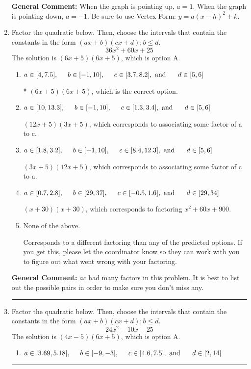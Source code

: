 \documentclass{extbook}[14pt]
\newcommand{\litem}[1]{\item #1

\rule{\textwidth}{0.4pt}}
\begin{document}
\begin{enumerate}
{\textbf{General Comment:} When the graph is pointing up, $a=1$. When the graph is pointing down, $a=-1$. Be sure to use Vertex Form: $y = a(x-h)^2+k$.
}
\litem{
Factor the quadratic below. Then, choose the intervals that contain the constants in the form $(ax+b)(cx+d); b \leq d.$
\[ 36x^{2} +60 x + 25 \]The solution is \( (6x + 5)(6x + 5) \), which is option A.\begin{enumerate}[label=\Alph*.]
\item \( a \in [4, 7.5], \hspace*{5mm} b \in [-1, 10], \hspace*{5mm} c \in [3.7, 8.2], \text{ and } \hspace*{5mm} d \in [5, 6] \)

* $(6x + 5)(6x + 5)$, which is the correct option.
\item \( a \in [10, 13.3], \hspace*{5mm} b \in [-1, 10], \hspace*{5mm} c \in [1.3, 3.4], \text{ and } \hspace*{5mm} d \in [5, 6] \)

 $(12x + 5)(3x + 5)$, which corresponds to associating some factor of a to c.
\item \( a \in [1.8, 3.2], \hspace*{5mm} b \in [-1, 10], \hspace*{5mm} c \in [8.4, 12.3], \text{ and } \hspace*{5mm} d \in [5, 6] \)

 $(3x + 5)(12x + 5)$, which corresponds to associating some factor of c to a.
\item \( a \in [0.7, 2.8], \hspace*{5mm} b \in [29, 37], \hspace*{5mm} c \in [-0.5, 1.6], \text{ and } \hspace*{5mm} d \in [29, 34] \)

 $(x + 30)(x + 30)$, which corresponds to factoring $x^{2} +60 x + 900$.
\item \( \text{None of the above.} \)

 Corresponds to a different factoring than any of the predicted options. If you get this, please let the coordinator know so they can work with you to figure out what went wrong with your factoring.
\end{enumerate}

\textbf{General Comment:} $ac$ had many factors in this problem. It is best to list out the possible pairs in order to make sure you don't miss any.
}
\litem{
Factor the quadratic below. Then, choose the intervals that contain the constants in the form $(ax+b)(cx+d); b \leq d.$
\[ 24x^{2} -10 x -25 \]The solution is \( (4x -5)(6x + 5) \), which is option A.\begin{enumerate}[label=\Alph*.]
\item \( a \in [3.69, 5.18], \hspace*{5mm} b \in [-9, -3], \hspace*{5mm} c \in [4.6, 7.5], \text{ and } \hspace*{5mm} d \in [2, 14] \)


\end{enumerate}}
\end{enumerate}
\end{document}
